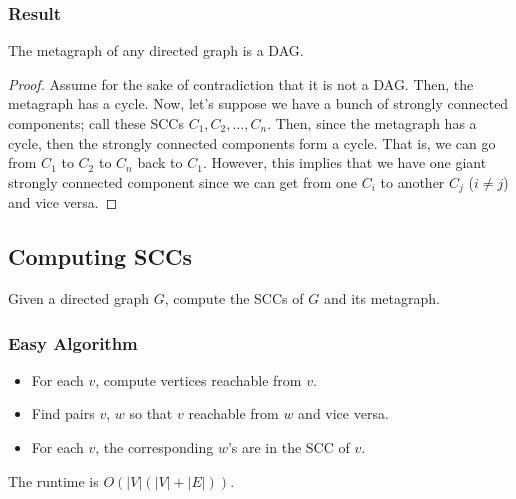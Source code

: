 \documentclass[letterpaper]{article}
\begin{document}
\subsubsection{Result}
\begin{theorem}{}{}
    The metagraph of any directed graph is a DAG. 
\end{theorem}

\begin{mdframed}[]
    \begin{proof}
        Assume for the sake of contradiction that it is not a DAG. Then, the metagraph has a cycle. Now, let's suppose we have a bunch of strongly connected components; call these SCCs $C_1, C_2, \dots, C_n$. Then, since the metagraph has a cycle, then the strongly connected components form a cycle. That is, we can go from $C_1$ to $C_2$ to $C_n$ back to $C_1$. However, this implies that we have one giant strongly connected component since we can get from one $C_i$ to another $C_j$ ($i \neq j$) and vice versa.     
    \end{proof}
\end{mdframed}


\subsection{Computing SCCs}
Given a directed graph $G$, compute the SCCs of $G$ and its metagraph. 

\subsubsection{Easy Algorithm}
\begin{itemize}
    \item For each $v$, compute vertices reachable from $v$.
    \item Find pairs $v$, $w$ so that $v$ reachable from $w$ and vice versa.
    \item For each $v$, the corresponding $w$'s are in the SCC of $v$.
\end{itemize}
The runtime is $O(|V|(|V| + |E|))$.
\end{document}
